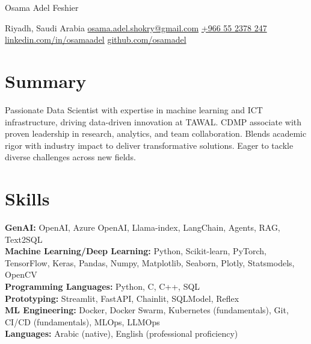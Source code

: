 \documentclass[10pt, letterpaper]{article}
\newenvironment{header}{
    \centering\linespread{1.3}
}{
    \par
}
\begin{document}
\begin{header}
    \fontsize{25pt}{25pt}\selectfont Osama Adel Feshier

    \vspace{5pt}

    \normalsize
    Riyadh, Saudi Arabia \textbar{}
    \href{mailto:osama.adel.shokry@gmail.com}{osama.adel.shokry@gmail.com} \textbar{}
    \href{tel:+966552378247}{+966 55 2378 247} \textbar{}
    \href{https://www.linkedin.com/in/osamaadel/}{linkedin.com/in/osamaadel} \textbar{}
    \href{https://github.com/osamadel}{github.com/osamadel}
\end{header}

\vspace{0.5cm}

\section{Summary}
Passionate Data Scientist with expertise in machine learning and ICT infrastructure, driving data-driven innovation at TAWAL. CDMP associate with proven leadership in research, analytics, and team collaboration. Blends academic rigor with industry impact to deliver transformative solutions. Eager to tackle diverse challenges across new fields.

\vspace{0.5cm}

\section{Skills}
\textbf{GenAI:} OpenAI, Azure OpenAI, Llama-index, LangChain, Agents, RAG, Text2SQL \\
\textbf{Machine Learning/Deep Learning:} Python, Scikit-learn, PyTorch, TensorFlow, Keras, Pandas, Numpy, Matplotlib, Seaborn, Plotly, Statsmodels, OpenCV \\
\textbf{Programming Languages:} Python, C, C++, SQL \\
\textbf{Prototyping:} Streamlit, FastAPI, Chainlit, SQLModel, Reflex \\
\textbf{ML Engineering:} Docker, Docker Swarm, Kubernetes (fundamentals), Git, CI/CD (fundamentals), MLOps, LLMOps \\
\textbf{Languages:} Arabic (native), English (professional proficiency)

\vspace{0.5cm}
\end{document}
